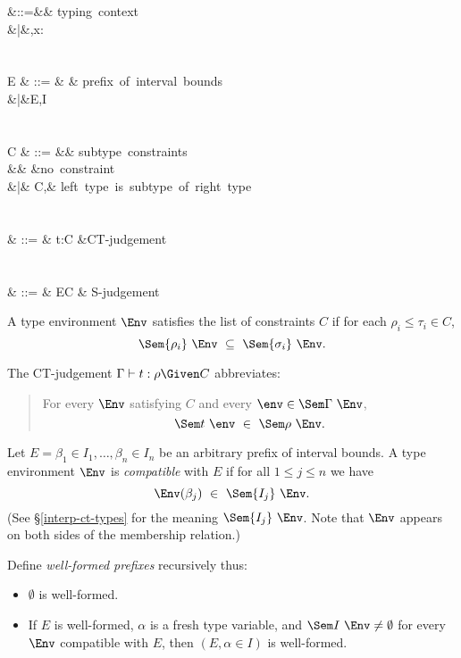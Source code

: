 \documentclass{amsart}
\begin{document}
\begin{syntax}
\Gamma &::=&\emptyset& \mbox{typing context}\\
&|&\Gamma,x:\sigma\\
\\\\
E & ::= & \emptyset & \mbox{prefix of interval bounds}\\
&|&E,\alpha\in I\\
\\\\
C & ::= && \mbox{subtype constraints}\\
&& \emptyset &\mbox{no constraint}\\
&|& C,\rho\le\tau & \mbox{left type is subtype of right type}\\
\\\\
\JCT & ::= & \Gamma\vdash t:\rho\Given C
&\mbox{CT-judgement}\\
\\\\
\JS & ::= & E\vdash C & \mbox{S-judgement}
\end{syntax}

A type environment $\Env$ satisfies the list of constraints $C$
if for each $\rho_i\le\tau_i\in C$,
\[
\Sem{\rho_i}~\Env\ \subseteq\ \Sem{\sigma_i}~\Env.
\]

The CT-judgement $\Gamma\vdash t:\rho\Given C$ abbreviates:
\begin{quotation}
For every $\Env$ satisfying $C$ and every
$\env\in\Sem\Gamma~\Env$,
\[
\Sem t~\env\ \in\ \Sem\rho~\Env.
\]
\end{quotation}

Let $E=\beta_1\in I_1,\ldots,\beta_n\in I_n$ be an arbitrary
prefix of interval bounds. A type environment $\Env$ is
\emph{compatible} with $E$ if for all $1\le j\le n$ we have
\[
\Env(\beta_j)\ \in\ \Sem{I_j}~\Env.
\]
(See \S\ref{interp-ct-types} for the meaning $\Sem{I_j}~\Env$.
Note that $\Env$ appears on both sides of the membership relation.)

Define \emph{well-formed prefixes} recursively thus:
\begin{itemize}
\item $\emptyset$ is well-formed.
\item If $E$ is well-formed, $\alpha$ is a fresh type variable,
and $\Sem I~\Env\neq\emptyset$ for every $\Env$ compatible with
$E$, then $(E,\alpha\in I)$ is well-formed.
\end{itemize}
\end{document}
